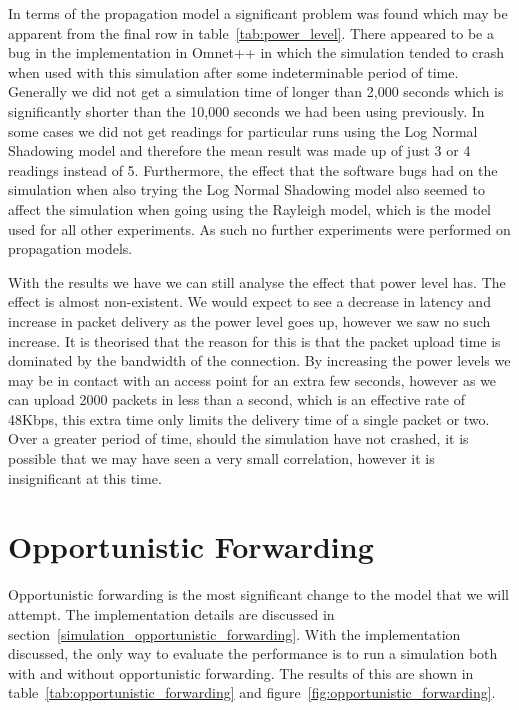         In terms of the propagation model a significant problem was found which may be apparent from the final row in table~\ref{tab:power_level}. There appeared to be a bug in the implementation in Omnet++ in which the simulation tended to crash when used with this simulation after some indeterminable period of time. Generally we did not get a simulation time of longer than 2,000 seconds which is significantly shorter than the 10,000 seconds we had been using previously. In some cases we did not get readings for particular runs using the Log Normal Shadowing model and therefore the mean result was made up of just 3 or 4 readings instead of 5. Furthermore, the effect that the software bugs had on the simulation when also trying the Log Normal Shadowing model also seemed to affect the simulation when going using the Rayleigh model, which is the model used for all other experiments. As such no further experiments were performed on propagation models. 

        With the results we have we can still analyse the effect that power level has. The effect is almost non-existent. We would expect to see a decrease in latency and increase in packet delivery as the power level goes up, however we saw no such increase. It is theorised that the reason for this is that the packet upload time is dominated by the bandwidth of the connection. By increasing the power levels we may be in contact with an access point for an extra few seconds, however as we can upload 2000 packets in less than a second, which is an effective rate of 48Kbps, this extra time only limits the delivery time of a single packet or two. Over a greater period of time, should the simulation have not crashed, it is possible that we may have seen a very small correlation, however it is insignificant at this time. 


    \section{Opportunistic Forwarding}\label{data_gathering_performance_opportunistic_forwarding}

        Opportunistic forwarding is the most significant change to the model that we will attempt. The implementation details are discussed in section~\ref{simulation_opportunistic_forwarding}. With the implementation discussed, the only way to evaluate the performance is to run a simulation both with and without opportunistic forwarding. The results of this are shown in table~\ref{tab:opportunistic_forwarding} and figure~\ref{fig:opportunistic_forwarding}.

